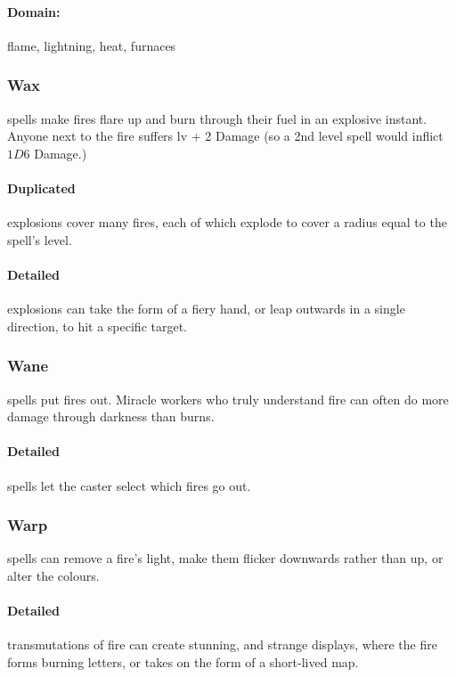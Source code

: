 \begin{multicols}{2}
\paragraph{Domain:}
flame, lightning, heat, furnaces

\subsubsection{Wax}
spells make fires flare up and burn through their fuel in an explosive instant.
Anyone next to the fire suffers \gls{lv} + 2 Damage (so a 2nd level spell would inflict $1D6$ Damage.)

\paragraph{Duplicated}
explosions cover many fires, each of which explode to cover a radius equal to the spell's level.

\paragraph{Detailed}
explosions can take the form of a fiery hand, or leap outwards in a single direction, to hit a specific target.

\subsubsection{Wane}
spells put fires out.
Miracle workers who truly understand fire can often do more damage through darkness than burns.

\paragraph{Detailed}
spells let the caster select which fires go out.

\subsubsection{Warp}
spells can remove a fire's light, make them flicker downwards rather than up, or alter the colours.

\paragraph{Detailed}
transmutations of fire can create stunning, and strange displays, where the fire forms burning letters, or takes on the form of a short-lived map.


\end{multicols}
